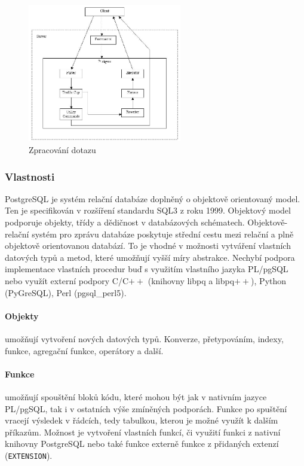 \documentclass[a4paper,12pt,oneside]{report}
\begin{document}
  
\begin{figure}[h!]
    \centering
    \includegraphics[width=0.6\textwidth]{./img/implementace/postgremodel1.jpg}
    \caption[Dotaz PostgreSQL]{\centering  Zpracování dotazu \footnotemark}
 \end{figure}   




\subsubsection{Vlastnosti}
PostgreSQL je systém relační databáze doplněný o objektově orientovaný model. Ten je specifikován v rozšíření standardu SQL3 z roku 1999\cite{sql1999}. Objektový model podporuje objekty, třídy a dědičnost v databázových schématech. Objektově-relační systém pro zprávu databáze  poskytuje střední cestu mezi relační a plně objektově orientovanou databází. To je vhodné v možnosti vytváření vlastních datových typů a metod, které umožňují vyšší míry abstrakce. Nechybí podpora implementace vlastních procedur buď s využitím vlastního jazyka PL/pgSQL nebo využít externí podpory C/C$++$ (knihovny libpq a libpq$++$), Python (PyGreSQL), Perl (pgsql\_perl5).


\paragraph{Objekty} umožňují vytvoření nových datových typů. Konverze, přetypováním, indexy, funkce, agregační funkce, operátory a další.  
\paragraph*{Funkce} umožňují spouštění bloků kódu, které mohou být jak v nativním jazyce PL/pgSQL, tak i v ostatních výše zmíněných podporách. Funkce po spuštění vracejí výsledek v řádcích, tedy tabulkou, kterou je možné využít k dalším příkazům. Možnost je vytvoření vlastních funkcí, či využití funkci z nativní knihovny PostgreSQL nebo také funkce externě funkce z přidaných extenzí (\texttt{EXTENSION}).
\end{document}
